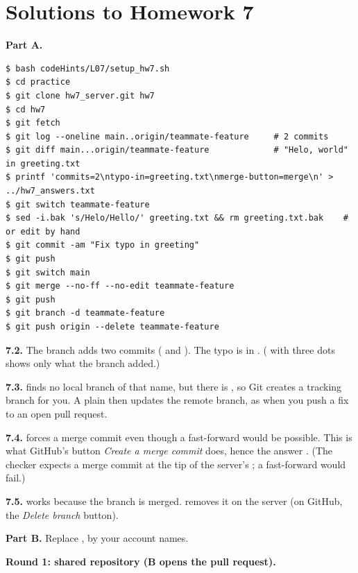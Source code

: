 \section*{Solutions to Homework 7}

\textbf{Part A.}

\begin{lstlisting}
$ bash codeHints/L07/setup_hw7.sh
$ cd practice
$ git clone hw7_server.git hw7
$ cd hw7
$ git fetch
$ git log --oneline main..origin/teammate-feature     # 2 commits
$ git diff main...origin/teammate-feature             # "Helo, world" in greeting.txt
$ printf 'commits=2\ntypo-in=greeting.txt\nmerge-button=merge\n' > ../hw7_answers.txt
$ git switch teammate-feature
$ sed -i.bak 's/Helo/Hello/' greeting.txt && rm greeting.txt.bak    # or edit by hand
$ git commit -am "Fix typo in greeting"
$ git push
$ git switch main
$ git merge --no-ff --no-edit teammate-feature
$ git push
$ git branch -d teammate-feature
$ git push origin --delete teammate-feature
\end{lstlisting}

\textbf{7.2.} The branch adds two commits ( and ). The typo is  in . ( with three dots shows only what the branch added.)

\textbf{7.3.}  finds no local branch of that name, but there is , so Git creates a tracking branch for you. A plain  then updates the remote branch, as when you push a fix to an open pull request.

\textbf{7.4.}  forces a merge commit even though a fast-forward would be possible. This is what GitHub's button \emph{Create a merge commit} does, hence the answer . (The checker expects a merge commit at the tip of the server's ; a fast-forward would fail.)

\textbf{7.5.}  works because the branch is merged.  removes it on the server (on GitHub, the \emph{Delete branch} button).

\textbf{Part B.} Replace ,  by your account names.

\textbf{Round 1: shared repository (B opens the pull request).}

